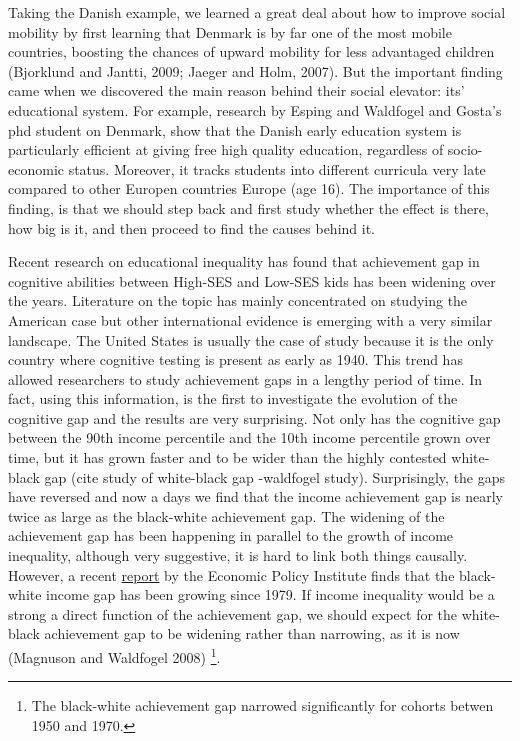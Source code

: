 \documentclass[11pt, a4paper]{article}\usepackage[]{graphicx}\usepackage[]{color}
\begin{document}
Taking the Danish example, we learned a great deal about how to improve social mobility by first learning that Denmark is by far one of the most mobile countries, boosting the chances of upward mobility for less advantaged children (Bjorklund and Jantti, 2009; Jaeger and Holm, 2007). But the important finding came when we discovered the main reason behind their social elevator: its' educational system. For example, research by Esping and Waldfogel and Gosta's phd student on Denmark, show that the Danish early education system is particularly efficient at giving free high quality education, regardless of socio-economic status. Moreover, it tracks students into different curricula very late compared to other Europen countries Europe (age 16). The importance of this finding, is that we should step back and first study whether the effect is there, how big is it, and then proceed to find the causes behind it.

Recent research on educational inequality has found that achievement gap in cognitive abilities between High-SES and Low-SES kids has been widening over the years. Literature on the topic has mainly concentrated on studying the American case \citep{reardon2011} but other international evidence is emerging with a very similar landscape. The United States is usually the case of study because it is the only country where cognitive testing is present as early as 1940. This trend has allowed researchers to study achievement gaps in a lengthy period of time. In fact, using this information, \citep{reardon2011} is the first to investigate the evolution of the cognitive gap and the results are very surprising. Not only has the cognitive gap between the 90th income percentile and the 10th income percentile grown over time, but it has grown faster and to be wider than the highly contested white-black gap (cite study of white-black gap -waldfogel study). Surprisingly, the gaps have reversed and now a days we find that the income achievement gap is nearly twice as large as the black-white achievement gap. The widening of the achievement gap has been happening in parallel to the growth of income inequality, although very suggestive, it is hard to link both things causally. However, a recent \href{http://www.epi.org/files/pdf/101972.pdf}{report} by the Economic Policy Institute finds that the black-white income gap has been growing since 1979. If income inequality would be a strong a direct function of the achievement gap, we should expect for the white-black achievement gap to be widening rather than narrowing, as it is now (Magnuson and Waldfogel 2008) \footnote{The black-white achievement gap narrowed significantly for cohorts betwen 1950 and 1970.}.
\end{document}

